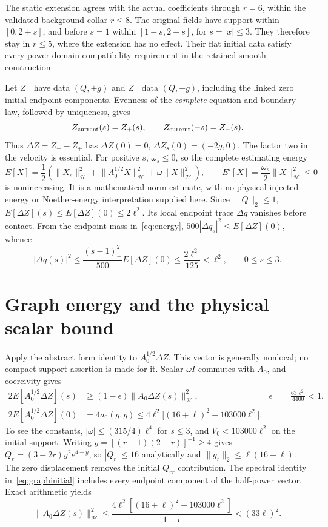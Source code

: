 \documentclass[10pt]{article}
\newcommand{\Hh}{\mathcal H}
\newcommand{\dd}{\Delta}
\newcommand{\norm}[1]{\lVert#1\rVert}
\begin{document}
The static extension agrees with the actual coefficients through \(r=6\),
within the validated background collar \(r\le8\).
The original fields have support within \([0,2+s]\), and before \(s=1\)
within \([1-s,2+s]\), for \(s=|x|\le3\). They therefore stay in \(r\le5\),
where the extension has no effect. Their flat initial data satisfy every
power-domain compatibility requirement in the retained smooth construction.

Let \(Z_+\) have data \((Q,+g)\) and \(Z_-\) data \((Q,-g)\), including
the linked zero initial endpoint components. Evenness of the \emph{complete}
equation and boundary law, followed by uniqueness, gives
\[
 Z_{\rm current}(s)=Z_+(s),\qquad Z_{\rm current}(-s)=Z_-(s).
\]
Thus \(\dd Z=Z_--Z_+\) has \(\dd Z(0)=0\),
\(\dd Z_s(0)=(-2g,0)\). The factor two in the velocity is essential.
For positive \(s\), \(\omega_s\le0\), so the complete estimating energy
\begin{equation}\label{eq:energy}
 E[X]=\frac12\left(\norm{X_s}_{\Hh}^2+
       \norm{A_0^{1/2}X}_{\Hh}^2+\omega\norm X_{\Hh}^2\right),
 \qquad E'[X]=\frac{\omega_s}{2}\norm X_{\Hh}^2\le0
\end{equation}
is nonincreasing. It is a mathematical norm estimate, with no physical
injected-energy or Noether-energy interpretation supplied here.
Since \(\norm Q_2\le1\),
\(E[\dd Z](s)\le E[\dd Z](0)\le2\ell^2\).
Its local endpoint trace \(\dd q\) vanishes before contact. From the endpoint
mass in~\eqref{eq:energy}, \(500|\dd q_s|^2\le E[\dd Z](0)\), whence
\begin{equation}\label{eq:qbound}
 |\dd q(s)|^2\le\frac{(s-1)_+^2}{500}E[\dd Z](0)
 \le\frac{2\ell^2}{125}<\ell^2,\qquad0\le s\le3.
\end{equation}

\section{Graph energy and the physical scalar bound}

Apply the abstract form identity to \(A_0^{1/2}\dd Z\). This vector is
generally nonlocal; no compact-support assertion is made for it.
Scalar \(\omega I\) commutes with \(A_0\), and coercivity gives
\begin{align}
 2E[A_0^{1/2}\dd Z](s)&\ge(1-\epsilon)\norm{A_0\dd Z(s)}_{\Hh}^2,
 &\epsilon&=\frac{63\ell^2}{4400}<1,\label{eq:coercive}\\
 2E[A_0^{1/2}\dd Z](0)&=4a_0(g,g)
 \le4\ell^2\bigl[(16+\ell)^2+103000\ell^2\bigr].\label{eq:graphinitial}
\end{align}
To see the constants, \(|\omega|\le(315/4)\ell^4\) for \(s\le3\),
and \(V_0<103000\ell^2\) on the initial support. Writing
\(y=[(r-1)(2-r)]^{-1}\ge4\) gives
\(Q_r=(3-2r)y^2e^{4-y}\), so \(|Q_r|\le16\) analytically and
\(\norm{g_r}_2\le\ell(16+\ell)\).
The zero displacement removes the initial \(Q_{rr}\) contribution.
The spectral identity in~\eqref{eq:graphinitial} includes every endpoint
component of the half-power vector. Exact arithmetic yields
\begin{equation}\label{eq:graphbound}
 \norm{A_0\dd Z(s)}_{\Hh}^2
 \le\frac{4\ell^2[(16+\ell)^2+103000\ell^2]}{1-\epsilon}
 <(33\ell)^2.
\end{equation}
\end{document}
